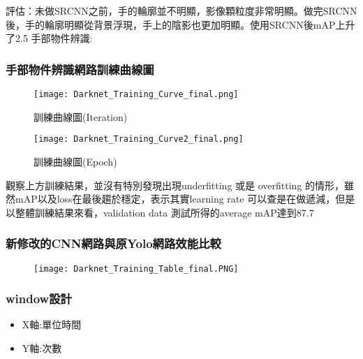 評估：未做SRCNN之前，手的輪廓並不明顯，影像顆粒度非常明顯。做完SRCNN後，手的輪廓明顯從背景浮現，手上的陰影也更加明顯。使用SRCNN後mAP上升了2.5%
手部物件辨識:

\subsubsection{手部物件辨識網路訓練曲線圖}

\begin{figure}[H]
    \centering
    \texttt{[image: Darknet\_Training\_Curve\_final.png]}
    \caption{訓練曲線圖(Iteration)}
    \label{fig:訓練曲線圖(Iteration)}
\end{figure}

\begin{figure}[H]
    \centering
    \texttt{[image: Darknet\_Training\_Curve2\_final.png]}
    \caption{訓練曲線圖(Epoch)}
    \label{fig:訓練曲線圖(Epoch)}
\end{figure}


觀察上方訓練結果，並沒有特別發現出現underfitting 或是 overfitting 的情形，雖然mAP以及loss在最後趨於穩定，表示其實learning rate 可以查是在做遞減，但是以整體訓練結果來看，validation data 測試所得的average mAP達到87.7%

\subsubsection{新修改的CNN網路與原Yolo網路效能比較}

\begin{figure}[H]
    \centering
    \texttt{[image: Darknet\_Training\_Table\_final.PNG]}
    \caption{}
    
\end{figure}




\subsubsection{window設計}

\begin{itemize}
\item X軸:單位時間
\item Y軸:次數
\end{itemize}

